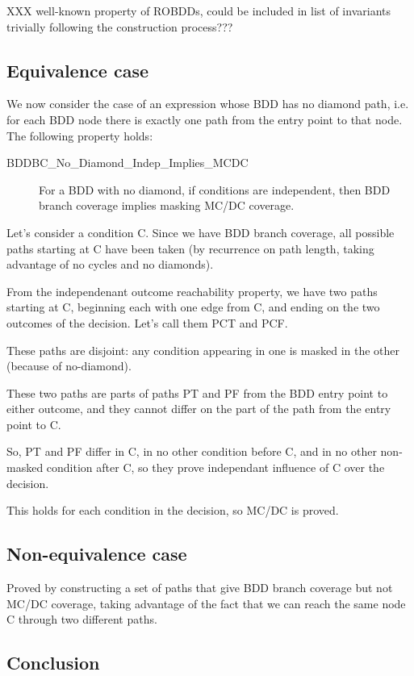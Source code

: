 \documentclass[a4paper,12pt,twoside]{article}
\begin{document}
XXX well-known property of ROBDDs, could be included in list
of invariants trivially following the construction process???

\subsection{Equivalence case}

We now consider the case of an expression whose BDD has no diamond path,
i.e. for each BDD node there is exactly one path from the entry point to
that node. The following property holds:

\begin{description}
\item[BDDBC\_No\_Diamond\_Indep\_Implies\_MCDC]
  For a BDD with no diamond, if conditions are independent, then
  BDD branch coverage implies masking MC/DC coverage.
\end{description}

Let's consider a condition C. Since we have BDD branch coverage,
all possible paths starting at C have been taken (by recurrence on path
length, taking advantage of no cycles and no diamonds).

From the independenant outcome reachability property, we have two paths
starting at C, beginning each with one edge from C, and ending on the
two outcomes of the decision. Let's call them PCT and PCF.

These paths are disjoint: any condition appearing in one is masked
in the other (because of no-diamond).

These two paths are parts of paths PT and PF from the BDD entry point to
either outcome, and they cannot differ on the part of the path from the
entry point to C.

So, PT and PF differ in C, in no other condition before C, and in no
other non-masked condition after C, so they prove independant influence
of C over the decision.

This holds for each condition in the decision, so MC/DC is proved.

\subsection{Non-equivalence case}

Proved by constructing a set of paths that give BDD branch coverage but
not MC/DC coverage, taking advantage of the fact that we can reach the
same node C through two different paths.

\subsection{Conclusion}
\end{document}
